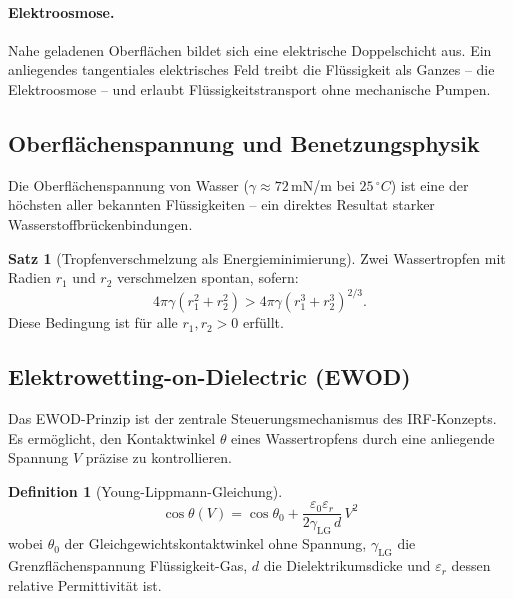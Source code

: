 ﻿\documentclass[a4paper,12pt]{scrreprt}
\theoremstyle{definition}
\newtheorem{definition}{Definition}[section]
\newtheorem{satz}{Satz}[section]
\begin{document}
\paragraph{Elektroosmose.}
Nahe geladenen Oberflächen bildet sich eine elektrische Doppelschicht aus.
Ein anliegendes tangentiales elektrisches Feld treibt die Flüssigkeit als
Ganzes -- die Elektroosmose -- und erlaubt Flüssigkeitstransport ohne
mechanische Pumpen.

\subsection{Oberflächenspannung und Benetzungsphysik}

Die Oberflächenspannung von Wasser ($\gamma \approx 72$\,mN/m bei $25\,^{\circ}C$)
ist eine der höchsten aller bekannten Flüssigkeiten -- ein direktes Resultat
starker Wasserstoffbrückenbindungen.

\begin{satz}[Tropfenverschmelzung als Energieminimierung]
  Zwei Wassertropfen mit Radien $r_1$ und $r_2$ verschmelzen spontan, sofern:
  \begin{equation}
    4\pi\gamma(r_1^2 + r_2^2) > 4\pi\gamma(r_1^3 + r_2^3)^{2/3}.
    \label{eq:energieminimierung}
  \end{equation}
  Diese Bedingung ist für alle $r_1, r_2 > 0$ erfüllt.
\end{satz}

\subsection{Elektrowetting-on-Dielectric (EWOD)}

Das EWOD-Prinzip ist der zentrale Steuerungsmechanismus des IRF-Konzepts.
Es ermöglicht, den Kontaktwinkel $\theta$ eines Wassertropfens durch eine
anliegende Spannung $V$ präzise zu kontrollieren.

\begin{definition}[Young-Lippmann-Gleichung]
  \begin{equation}
    \cos\theta(V) = \cos\theta_0 + \frac{\varepsilon_0 \varepsilon_r}{2\gamma_{\mathrm{LG}}\, d}\, V^2
    \label{eq:young_lippmann}
  \end{equation}
  wobei $\theta_0$ der Gleichgewichtskontaktwinkel ohne Spannung,
  $\gamma_{\mathrm{LG}}$ die Grenzflächenspannung Flüssigkeit-Gas, $d$ die
  Dielektrikumsdicke und $\varepsilon_r$ dessen relative Permittivität ist.
\end{definition}
\end{document}
